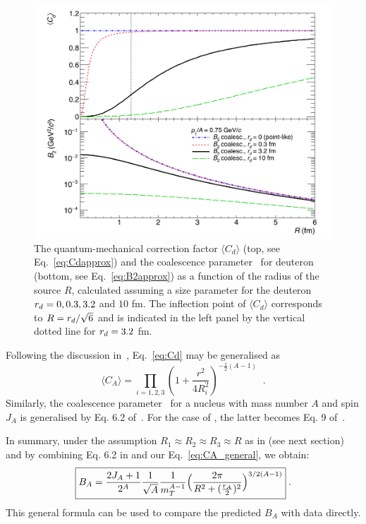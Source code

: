 \documentclass[%
 reprint,
 amsmath,amssymb,
 aps,
]{revtex4-1}
\begin{document}
\begin{figure}[hb]
\begin{center}
\includegraphics[width=\columnwidth]{theory_coalescence_Cd_B2_vert.png}
\caption{{The quantum-mechanical correction factor $\langle C_{d} \rangle$ (top, see Eq.~\ref{eq:Cdapprox}) and the coalescence parameter \btwo~for deuteron (bottom, see Eq.~\ref{eq:B2approx}) as a function of the radius of the source $R$, calculated assuming a size parameter for the deuteron $r_{d} = 0, 0.3, 3.2$ and $10$ fm. The inflection point of $\langle C_{d} \rangle$ corresponds to $R = r_{d}/\sqrt{6}$ and is indicated in the left panel by the vertical dotted line for $r_{d} = 3.2$ fm.}}
\label{fig:radiusDependence}
\end{center}
\end{figure}   

Following the discussion in~\cite{Blum:2017qnn}, Eq.~\ref{eq:Cd} may be generalised as 
%
\begin{equation}
\langle C_{A} \rangle = \prod_{i=1,2,3} \left(1 + \frac{r^2}{4R_{i}^2} \right)^{-\frac{1}{2}(A-1)} \;\; .
\label{eq:CA_general}
\end{equation}
%
Similarly, the coalescence parameter \bA~for a nucleus with mass number $A$ and spin $J_{A}$ is generalised by Eq. 6.2 of~\cite{Scheibl:1998tk}.
For the case of \hethree, the latter becomes Eq. 9 of~\cite{Blum:2017qnn}.

In summary, under the assumption $R_1\approx R_2 \approx R_3 \approx R$ as in \cite{Blum:2017qnn} (see next section) and by combining Eq. 6.2 in \cite{Scheibl:1998tk} and our Eq.~\ref{eq:CA_general}, we obtain:
%
\begin{equation}
	\boxed {  B_{A} = {2J_{A} + 1 \over 2^{A}} {1 \over \sqrt{A}} {1 \over m_{T}^{A-1}} \Bigl({2\pi \over R^2 + ({r_A \over 2})^2 }\Bigr)^{3/2(A-1)} } \;.
\end{equation}
%
This general formula can be used to compare the predicted $B_{A}$ with data directly.
 
\end{document}
